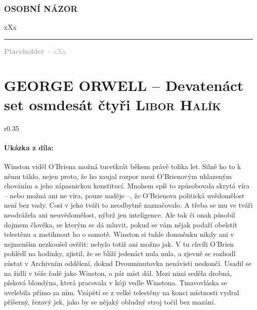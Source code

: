 \documentclass[A4paper]{extarticle} %
\begin{document}


\section*{OSOBNÍ NÁZOR}
\noindent 
xXx

\vfill

\noindent\begin{minipage}{\textwidth}
    \textcolor{darkgray}{\rule{\linewidth}{0.4pt}
    \footnotesize
    \textbf{Placeholder --} xXx
    }
\end{minipage}

\newpage


\changefontsize{7pt}

\part*{GEORGE ORWELL -- Devatenáct set osmdesát čtyři {\hfill \normalfont\tiny\textsc{Libor Halík}}}

\noindent\begin{wrapfigure}{r}{0.35\textwidth}
\tiny

\subsection*{Ukázka z díla:}
\setlength{\parindent}{3pt}\setlength{\parskip}{0.5em}
Winston viděl O’Briena možná tucetkrát během právě tolika let. Silně ho to k němu táhlo, nejen proto, že ho zaujal rozpor mezi O’Brienovým uhlazeným chováním a jeho zápasnickou konstitucí. Mnohem spíš to způsobovala skrytá víra – nebo možná ani ne víra, pouze naděje –, že O’Brienova politická uvědomělost není bez vady. Cosi v jeho tváři to neodbytně naznačovalo. A třeba se mu ve tváři neodrážela ani neuvědomělost, nýbrž jen inteligence. Ale tak či onak působil dojmem člověka, se kterým se dá mluvit, pokud se vám nějak podaří obelstít telestěnu a zastihnout ho o samotě. Winston si tuhle domněnku nikdy ani v nejmenším nezkoušel ověřit: nebylo totiž ani možno jak. V tu chvíli O’Brien pohlédl na hodinky, zjistil, že se blíží jedenáct nula nula, a zjevně se rozhodl zůstat v Archivním oddělení, dokud Dvouminutovka nenávisti neskončí. Usadil se na židli v téže řadě jako Winston, o pár míst dál. Mezi nimi seděla drobná, písková blondýna, která pracovala v kóji vedle Winstona. Tmavovláska se uvelebila přímo za ním. Vzápětí se z velké telestěny na konci místnosti vydral příšerný, řezavý jek, jako by se nějaký obludný stroj točil bez mazání.
\end{wrapfigure}
\end{document}
